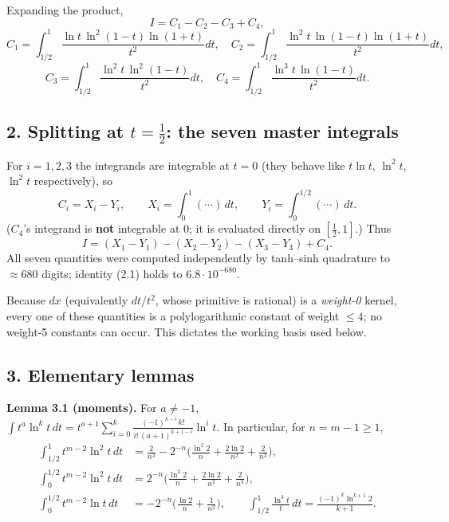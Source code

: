 \documentclass[11pt]{article}
\theoremstyle{remark}
\begin{document}
Expanding the product,
\[
I=C_1-C_2-C_3+C_4,
\]
\[
C_1=\int_{1/2}^{1}\frac{\ln t\,\ln^2(1-t)\ln(1+t)}{t^2}dt,\quad
C_2=\int_{1/2}^{1}\frac{\ln^2 t\,\ln(1-t)\ln(1+t)}{t^2}dt,
\]
\[
C_3=\int_{1/2}^{1}\frac{\ln^2 t\,\ln^2(1-t)}{t^2}dt,\quad
C_4=\int_{1/2}^{1}\frac{\ln^3 t\,\ln(1-t)}{t^2}dt .
\]

\subsection*{2. Splitting at $t=\tfrac12$: the seven master integrals}

For $i=1,2,3$ the integrands are integrable at $t=0$ (they behave like $t\ln t$, $\ln^2t$, $\ln^2t$ respectively), so
\[
C_i=X_i-Y_i,\qquad X_i=\int_0^1(\cdots)\,dt,\qquad Y_i=\int_0^{1/2}(\cdots)\,dt .
\]
($C_4$'s integrand is \textbf{not} integrable at $0$; it is evaluated directly on $[\tfrac12,1]$.) Thus
\begin{equation*}
I=(X_1-Y_1)-(X_2-Y_2)-(X_3-Y_3)+C_4. \tag{2.1}
\end{equation*}
All seven quantities were computed independently by tanh--sinh quadrature to $\approx 680$ digits; identity (2.1) holds to $6.8\cdot10^{-680}$.

Because $dx$ (equivalently $dt/t^2$, whose primitive is rational) is a \emph{weight-0} kernel, every one of these quantities is a polylogarithmic constant of weight $\le 4$; no weight-5 constants can occur. This dictates the working basis used below.

\subsection*{3. Elementary lemmas}

\textbf{Lemma 3.1 (moments).} For $a\neq-1$, $\displaystyle\int t^a\ln^kt\,dt=t^{a+1}\sum_{i=0}^{k}\frac{(-1)^{k-i}\,k!}{i!\,(a+1)^{k+1-i}}\ln^it$. In particular, for $n=m-1\ge1$,
\[
\begin{aligned}
\int_{1/2}^{1}t^{m-2}\ln^2t\,dt&=\frac{2}{n^{3}}-2^{-n}\Big(\frac{\ln^2 2}{n}+\frac{2\ln 2}{n^{2}}+\frac{2}{n^{3}}\Big),\\
\int_0^{1/2}t^{m-2}\ln^2t\,dt&=2^{-n}\Big(\frac{\ln^2 2}{n}+\frac{2\ln 2}{n^{2}}+\frac{2}{n^{3}}\Big),\\
\int_0^{1/2}t^{m-2}\ln t\,dt&=-2^{-n}\Big(\frac{\ln2}{n}+\frac{1}{n^{2}}\Big),\qquad
\int_{1/2}^{1}\frac{\ln^kt}{t}\,dt=\frac{(-1)^k\ln^{k+1}2}{k+1}.
\end{aligned}
\]
\end{document}

